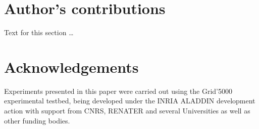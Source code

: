 \documentclass[doublespacing]{bmcart}
\begin{document}
\begin{backmatter}


\section{Author's contributions}
    Text for this section \ldots

\section{Acknowledgements}
Experiments presented in this paper were carried out using the Grid'5000
experimental testbed, being developed under the INRIA ALADDIN development action
with support from CNRS, RENATER and several Universities as well as other
funding bodies.




\end{backmatter}
\end{document}
